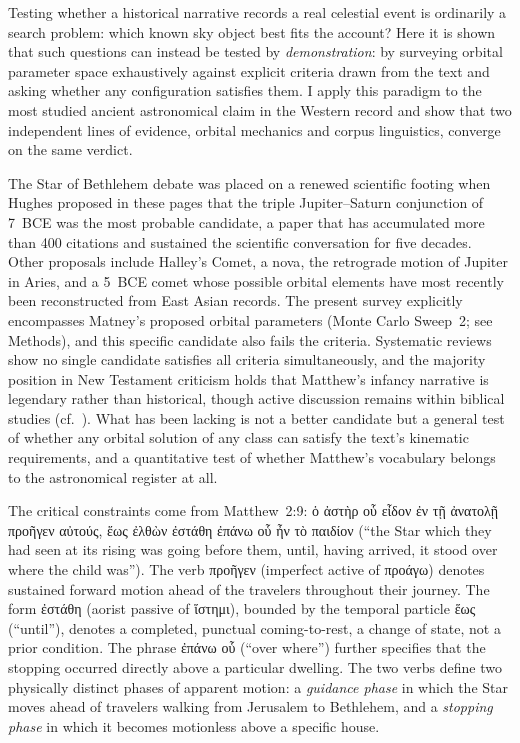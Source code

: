 \documentclass[sn-nature]{sn-jnl}
\newcommand{\grk}[1]{{\fontencoding{LGR}\selectfont #1}}
\newcommand{\grk}[1]{{\greekfont #1}}
\begin{document}
Testing whether a historical narrative records a real celestial event is
ordinarily a search problem: which known sky object best fits the account?
Here it is shown that such questions can instead be tested by \emph{demonstration}:
by surveying orbital parameter space exhaustively against explicit criteria
drawn from the text and asking whether any configuration satisfies them.
I apply this paradigm to the most studied ancient astronomical claim
in the Western record and show that two independent lines of evidence, orbital
mechanics and corpus linguistics, converge on the same verdict.

The Star of Bethlehem debate was placed on a renewed scientific footing when Hughes
proposed in these pages that the triple Jupiter--Saturn conjunction of 7~BCE
was the most probable candidate\cite{hughes1976,hughes1979}, a paper that has
accumulated more than 400 citations and sustained the scientific conversation
for five decades. Other proposals include Halley's Comet\cite{kokkinos1989},
a nova\cite{kidger1999,clark1977}, the retrograde motion of Jupiter in
Aries\cite{molnar1999}, and a 5~BCE comet whose possible orbital elements have most
recently been reconstructed from East Asian records\cite{humphreys1992star,matney2025jbaa}.
The present survey explicitly encompasses Matney's proposed orbital parameters
(Monte Carlo Sweep~2; see Methods), and this specific candidate also fails
the criteria.
Systematic reviews show no single candidate satisfies all criteria
simultaneously\cite{adair2013star,schaefer2015}, and the majority position in New Testament
criticism holds that Matthew's infancy narrative is legendary rather than
historical\cite{brown1993,sugihyono2025,merz2015}, though active discussion remains within biblical studies (cf.\ \cite{barthel2015,schaefer2015molnar,freitag1979}).
What has been lacking is not a better candidate but a general test of whether any orbital solution 
of any class can satisfy the text's kinematic requirements, and a quantitative test of whether 
Matthew's vocabulary belongs to the astronomical register at all.

The critical constraints come from Matthew~2:9:
\grk{ὁ ἀστὴρ οὗ εἶδον ἐν τῇ ἀνατολῇ προῆγεν αὐτούς, ἕως ἐλθὼν
ἐστάθη ἐπάνω οὗ ἦν τὸ παιδίον}
(``the Star which they had seen at its rising was going before them, until,
having arrived, it stood over where the child was'').
The verb \grk{προῆγεν} (imperfect active of \grk{προάγω}) denotes sustained
forward motion ahead of the travelers throughout their journey.
The form \grk{ἐστάθη} (aorist passive of \grk{ἵστημι}), bounded by the
temporal particle \grk{ἕως} (``until''), denotes a completed, punctual
coming-to-rest, a change of state, not a prior condition\cite{adair2013star}. 
The phrase \grk{ἐπάνω οὗ} (``over where'') further
specifies that the stopping occurred directly above a particular
dwelling\cite{adair2013star,heilen2015,bdag2000}.
The two verbs define two physically distinct phases of apparent motion:
a \emph{guidance phase} in which the Star moves ahead of travelers walking
from Jerusalem to Bethlehem, and a \emph{stopping phase} in which it becomes
motionless above a specific house.
\end{document}
